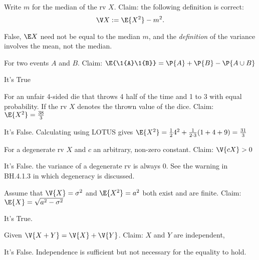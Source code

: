 \documentclass[tf-tutorial-all.tex]{subfiles}
\begin{document}
\begin{truefalse}
Write $m$ for the median of the rv $X$. Claim: the following definition is correct:
\begin{equation*}
\V X := \E{X^2} - m^{2}.
\end{equation*}
\begin{solution}
False, $\E X$ need not be equal to the median $m$, and  the \emph{definition} of the variance involves the mean, not the median.
\end{solution}
\end{truefalse}


\begin{truefalse}
    For two events $A$ and $B$. Claim: $\E{\1{A}\1{B}} = \P{A} + \P{B} - \P{A \cup B}$
\begin{solution}
It's True
\end{solution}
\end{truefalse}

\begin{truefalse}
For an unfair 4-sided die that throws 4 half of the time and 1 to 3 with equal probability.
If the rv
$X$ denotes the thrown value of the dice.
Claim: $\E{X^2} = \frac{38}{3}$
\begin{solution}
It's False. Calculating using LOTUS gives $\E{X^2} = \frac{1}{2} 4^{2} + \frac{1}{2\cdot3}(1 + 4 + 9) = \frac{31}{3}$
\end{solution}
\end{truefalse}

\begin{truefalse}
For a degenerate rv $X$ and $c$ an arbitrary, non-zero constant. Claim: $\V{cX} > 0$
\begin{solution}
It's False. the variance of a degenerate rv is always 0. See the warning in BH.4.1.3 in which degeneracy is discussed.
\end{solution}
\end{truefalse}

\begin{truefalse}
Assume that $\V{X} = \sigma^2$ and $\E{X^2} = a^2$ both exist and are finite. Claim:$ \E{X} = \sqrt{a^2-\sigma^2}$
\begin{solution}
It's True.
\end{solution}
\end{truefalse}

\begin{truefalse}
Given $\V{X+Y} = \V{X} + \V{Y}$. Claim: $X$ and $Y$ are independent,
\begin{solution}
It's False. Independence is sufficient but not necessary for the equality to hold.
\end{solution}
\end{truefalse}
\end{document}
